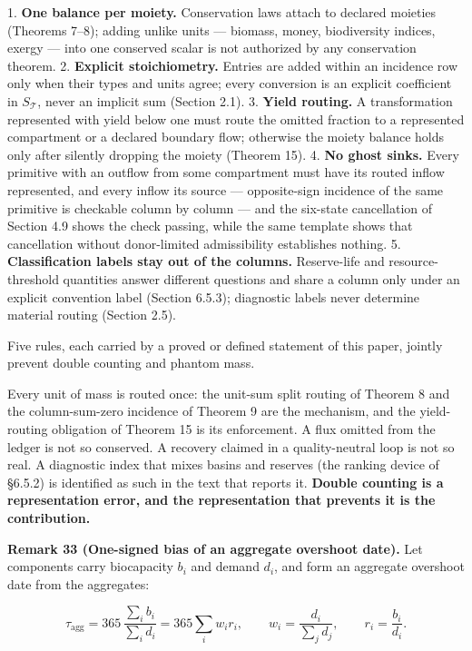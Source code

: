 \documentclass[11pt]{article}
\begin{document}
1. \textbf{One balance per moiety.} Conservation laws attach to declared moieties (Theorems 7--8); adding unlike units --- biomass, money, biodiversity indices, exergy --- into one conserved scalar is not authorized by any conservation theorem. 2. \textbf{Explicit stoichiometry.} Entries are added within an incidence row only when their types and units agree; every conversion is an explicit coefficient in \(S_{\mathcal{T}}\), never an implicit sum (Section 2.1). 3. \textbf{Yield routing.} A transformation represented with yield below one must route the omitted fraction to a represented compartment or a declared boundary flow; otherwise the moiety balance holds only after silently dropping the moiety (Theorem 15). 4. \textbf{No ghost sinks.} Every primitive with an outflow from some compartment must have its routed inflow represented, and every inflow its source --- opposite-sign incidence of the same primitive is checkable column by column --- and the six-state cancellation of Section 4.9 shows the check passing, while the same template shows that cancellation without donor-limited admissibility establishes nothing. 5. \textbf{Classification labels stay out of the columns.} Reserve-life and resource-threshold quantities answer different questions and share a column only under an explicit convention label (Section 6.5.3); diagnostic labels never determine material routing (Section 2.5).

Five rules, each carried by a proved or defined statement of this paper, jointly prevent double counting and phantom mass.

Every unit of mass is routed once: the unit-sum split routing of Theorem 8 and the column-sum-zero incidence of Theorem 9 are the mechanism, and the yield-routing obligation of Theorem 15 is its enforcement. A flux omitted from the ledger is not so conserved. A recovery claimed in a quality-neutral loop is not so real. A diagnostic index that mixes basins and reserves (the ranking device of \S6.5.2) is identified as such in the text that reports it. \textbf{Double counting is a representation error, and the representation that prevents it is the contribution.}

\textbf{Remark 33 (One-signed bias of an aggregate overshoot date).} Let components carry biocapacity \(b_i\) and demand \(d_i\), and form an aggregate overshoot date from the aggregates: 

$$\tau_{\mathrm{agg}}=365\,\frac{\sum_ib_i}{\sum_id_i}=365\sum_iw_ir_i, \qquad w_i=\frac{d_i}{\sum_jd_j}, \qquad r_i=\frac{b_i}{d_i}.$$
\end{document}

